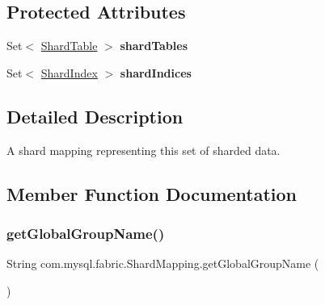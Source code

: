 \subsection*{Protected Attributes}
\begin{DoxyCompactItemize}
\item 
\mbox{\label{classcom_1_1mysql_1_1fabric_1_1_shard_mapping_a3f110db458b89a5a1cd4b71962ea969f}} 
Set$<$ \mbox{\hyperlink{classcom_1_1mysql_1_1fabric_1_1_shard_table}{Shard\+Table}} $>$ {\bfseries shard\+Tables}
\item 
\mbox{\label{classcom_1_1mysql_1_1fabric_1_1_shard_mapping_a2055d6631accc861410561fcbb180423}} 
Set$<$ \mbox{\hyperlink{classcom_1_1mysql_1_1fabric_1_1_shard_index}{Shard\+Index}} $>$ {\bfseries shard\+Indices}
\end{DoxyCompactItemize}


\subsection{Detailed Description}
A shard mapping representing this set of sharded data. 

\subsection{Member Function Documentation}
\mbox{\label{classcom_1_1mysql_1_1fabric_1_1_shard_mapping_a87e18cf8f09fdab3db0cf08d239fabd8}} 
\subsubsection{\texorpdfstring{get\+Global\+Group\+Name()}{getGlobalGroupName()}}
{\footnotesize\ttfamily String com.\+mysql.\+fabric.\+Shard\+Mapping.\+get\+Global\+Group\+Name (\begin{DoxyParamCaption}{ }\end{DoxyParamCaption})}


